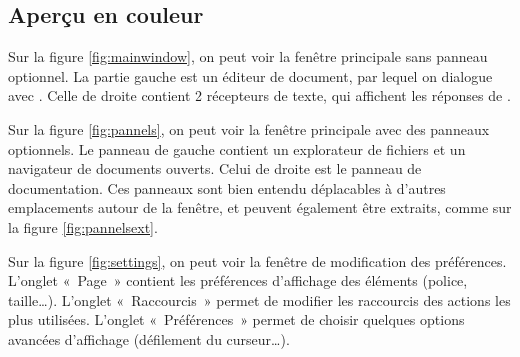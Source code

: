     \subsection{Aperçu en couleur}
    
        Sur la figure \ref{fig:mainwindow}, on peut voir la fenêtre principale sans panneau optionnel.
        La partie gauche est un éditeur de document, par lequel on dialogue avec \coq.
        Celle de droite contient 2 récepteurs de texte, qui affichent les réponses de \coq.
        
        Sur la figure \ref{fig:pannels}, on peut voir la fenêtre principale avec des panneaux optionnels.
        Le panneau de gauche contient un explorateur de fichiers et un navigateur de documents ouverts.
        Celui de droite est le panneau de documentation.
        Ces panneaux sont bien entendu déplacables à d'autres emplacements autour de la fenêtre, et peuvent également être extraits, comme sur la figure \ref{fig:pannelsext}.
        
        Sur la figure \ref{fig:settings}, on peut voir la fenêtre de modification des préférences.
        L'onglet « Page » contient les préférences d'affichage des éléments (police, taille…).
        L'onglet « Raccourcis » permet de modifier les raccourcis des actions les plus utilisées.
        L'onglet « Préférences » permet de choisir quelques options avancées d'affichage (défilement du curseur…).

